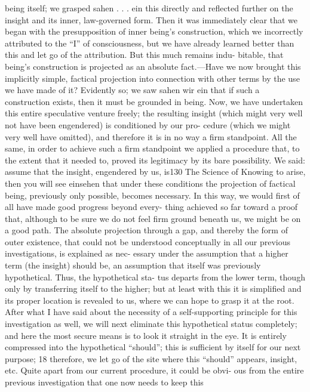being itself; we grasped {sahen . . . ein} this directly and reflected further on the
insight and its inner, law-governed form. Then it was immediately clear that
we began with the presupposition of inner being’s construction, which we
incorrectly attributed to the “I” of consciousness, but we have already learned
better than this and let go of the attribution. But this much remains indu-
bitable, that being’s construction is projected as an absolute fact.—Have we
now brought this implicitly simple, factical projection into connection with
other terms by the use we have made of it? Evidently so; we saw {sahen wir
ein} that if such a construction exists, then it must be grounded in being. Now,
we have undertaken this entire speculative venture freely; the resulting insight
(which might very well not have been engendered) is conditioned by our pro-
cedure (which we might very well have omitted), and therefore it is in no way
a firm standpoint. All the same, in order to achieve such a firm standpoint we
applied a procedure that, to the extent that it needed to, proved its legitimacy
by its bare possibility. We said: assume that the insight, engendered by us, is130
The Science of Knowing
to arise, then you will see {einsehen} that under these conditions the projection
of factical being, previously only possible, becomes necessary.
In this way, we would first of all have made good progress beyond every-
thing achieved so far toward a proof that, although to be sure we do not feel
firm ground beneath us, we might be on a good path. The absolute projection
through a gap, and thereby the form of outer existence, that could not be
understood conceptually in all our previous investigations, is explained as nec-
essary under the assumption that a higher term (the insight) should be, an
assumption that itself was previously hypothetical. Thus, the hypothetical sta-
tus departs from the lower term, though only by transferring itself to the
higher; but at least with this it is simplified and its proper location is revealed
to us, where we can hope to grasp it at the root.
After what I have said about the necessity of a self-supporting principle
for this investigation as well, we will next eliminate this hypothetical status
completely; and here the most secure means is to look it straight in the eye. It
is entirely compressed into the hypothetical “should”; this is sufficient by itself
for our next purpose; 18 therefore, we let go of the site where this “should”
appears, insight, etc. Quite apart from our current procedure, it could be obvi-
ous from the entire previous investigation that one now needs to keep this
